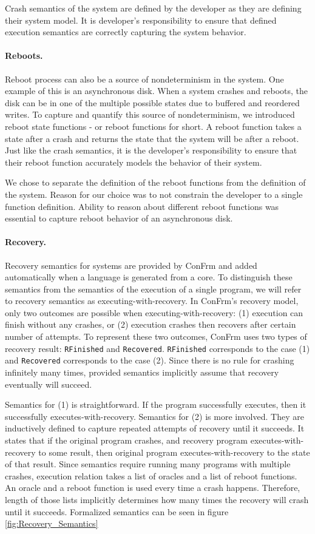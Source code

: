 Crash semantics of the system are defined by the developer as they are defining their system model. It is developer's responsibility to ensure that defined execution semantics are correctly capturing the system behavior.

\paragraph{Reboots.}
Reboot process can also be a source of nondeterminism in the system. One example of this is an asynchronous disk. When a system crashes and reboots, the disk can be in one of the multiple possible states due to buffered and reordered writes. To capture and quantify this source of nondeterminism, we introduced reboot state functions - or reboot functions for short. A reboot function takes a state after a crash and returns the state that the system will be after a reboot. Just like the crash semantics, it is the developer's responsibility to ensure that their reboot function accurately models the behavior of their system.

We chose to separate the definition of the reboot functions from the definition of the system. Reason for our choice was to not constrain the developer to a single function definition. Ability to reason about different reboot functions was essential to capture reboot behavior of an asynchronous disk.

\paragraph{Recovery.}
Recovery semantics for systems are provided by ConFrm and added automatically when a language is generated from a core. To distinguish these semantics from the semantics of the execution of a single program, we will refer to recovery semantics as executing-with-recovery. In ConFrm's recovery model, only two outcomes are possible when executing-with-recovery: (1) execution can finish without any crashes, or (2) execution crashes then recovers after certain number of attempts. To represent these two outcomes, ConFrm uses two types of recovery result: \texttt{RFinished} and \texttt{Recovered}. \texttt{RFinished} corresponds to the case (1) and \texttt{Recovered} corresponds to the case (2).
Since there is no rule for crashing infinitely many times, provided semantics implicitly assume that recovery eventually will succeed. 

Semantics for (1) is straightforward. If the program successfully executes, then it successfully executes-with-recovery.
Semantics for (2) is more involved. They are inductively defined to capture repeated attempts of recovery until it succeeds. It states that if the original program crashes, and recovery program executes-with-recovery to some result, then original program executes-with-recovery to the state of that result. Since semantics require running many programs with multiple crashes, execution relation takes a list of oracles and a list of reboot functions. An oracle and a reboot function is used every time a crash happens. Therefore, length of those lists implicitly determines how many times the recovery will crash until it succeeds. Formalized semantics can be seen in figure \ref{fig:Recovery_Semantics}



